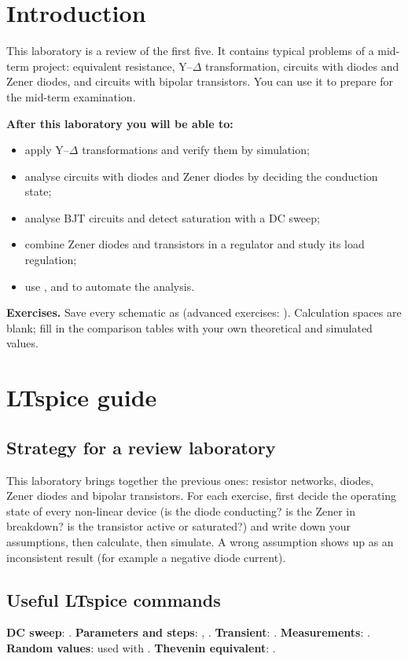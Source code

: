 
\section{Introduction}
This laboratory is a review of the first five. It contains typical problems of a mid-term project: equivalent resistance, Y--$\Delta$ transformation, circuits with diodes and Zener diodes, and circuits with bipolar transistors. You can use it to prepare for the mid-term examination.

\textbf{After this laboratory you will be able to:}
\begin{itemize}
  \item apply Y--$\Delta$ transformations and verify them by simulation;
  \item analyse circuits with diodes and Zener diodes by deciding the conduction state;
  \item analyse BJT circuits and detect saturation with a DC sweep;
  \item combine Zener diodes and transistors in a regulator and study its load regulation;
  \item use ,  and  to automate the analysis.
\end{itemize}

\textbf{Exercises.} Save every schematic as  (advanced exercises: ). Calculation spaces are blank; fill in the comparison tables with your own theoretical and simulated values.

\section{LTspice guide}

\subsection{Strategy for a review laboratory}
This laboratory brings together the previous ones: resistor networks, diodes, Zener diodes and bipolar transistors. For each exercise, first decide the operating state of every non-linear device (is the diode conducting? is the Zener in breakdown? is the transistor active or saturated?) and write down your assumptions, then calculate, then simulate. A wrong assumption shows up as an inconsistent result (for example a negative diode current).

\subsection{Useful LTspice commands}
\textbf{DC sweep}: . \textbf{Parameters and steps}: , . \textbf{Transient}: . \textbf{Measurements}: . \textbf{Random values}:  used with . \textbf{Thevenin equivalent}: .

